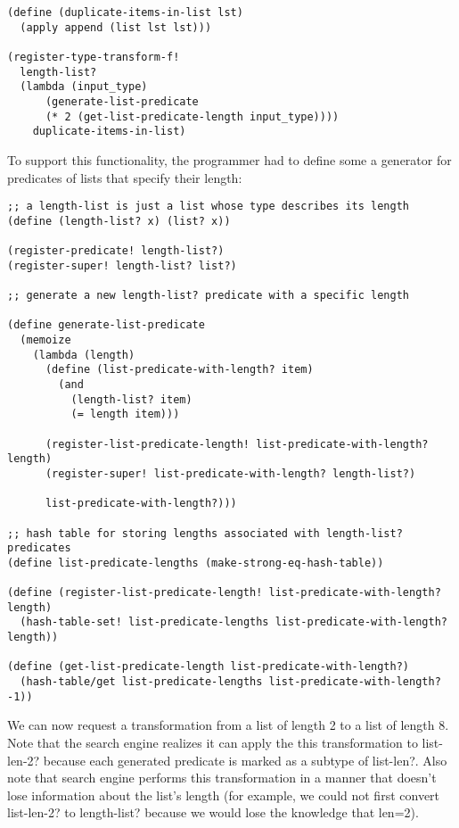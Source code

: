 \documentclass[letterpaper]{article}
\begin{document}
\begin{verbatim}
(define (duplicate-items-in-list lst)
  (apply append (list lst lst)))
  
(register-type-transform-f!
  length-list?
  (lambda (input_type) 
	  (generate-list-predicate
      (* 2 (get-list-predicate-length input_type))))
	duplicate-items-in-list)
\end{verbatim}

To support this functionality, the programmer had to define some a generator for predicates of lists that specify their length:

\begin{verbatim}
;; a length-list is just a list whose type describes its length
(define (length-list? x) (list? x))

(register-predicate! length-list?)
(register-super! length-list? list?)

;; generate a new length-list? predicate with a specific length

(define generate-list-predicate
  (memoize
    (lambda (length)
      (define (list-predicate-with-length? item)
        (and 
          (length-list? item)
          (= length item)))

      (register-list-predicate-length! list-predicate-with-length? length)
      (register-super! list-predicate-with-length? length-list?)
      
      list-predicate-with-length?))) 

;; hash table for storing lengths associated with length-list? predicates
(define list-predicate-lengths (make-strong-eq-hash-table)) 

(define (register-list-predicate-length! list-predicate-with-length? length)
  (hash-table-set! list-predicate-lengths list-predicate-with-length? length))

(define (get-list-predicate-length list-predicate-with-length?)
  (hash-table/get list-predicate-lengths list-predicate-with-length? -1))
\end{verbatim}

We can now request a transformation from a list of length 2 to a list of length 8. Note that the search engine realizes it can apply the this transformation to list-len-2? because each generated predicate is marked as a subtype of list-len?. Also note that search engine performs this transformation in a manner that doesn't lose information about the list's length (for example, we could not first convert list-len-2? to length-list? because we would lose the knowledge that len=2).
\end{document}
